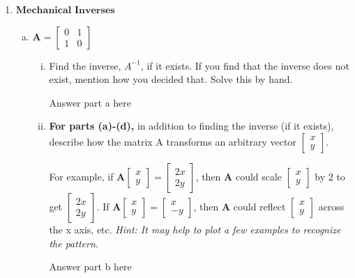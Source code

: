 \documentclass[11pt]{article}
\def\A{\textbf{A}} %
\begin{document}
\begin{enumerate}
	      \newpage
	\item $\textbf{Mechanical Inverses}$
	      \begin{enumerate}[(a)]
	      	\item $\A = \begin{bmatrix}
	      	      0 & 1 \\
	      	      1 & 0
	      	\end{bmatrix}$
	      	\begin{enumerate}[i.]
	      		\item Find the inverse, $A^{-1}$, if it exists. If you find that the inverse does not exist, mention how you decided that. Solve this by hand.
	      		      \begin{Answer}
	      		      	Answer part a here
	      		      \end{Answer}
	      		\item \textbf{For parts (a)-(d),} in addition to finding the inverse (if it exists), describe how the matrix A transforms an arbitrary vector $\begin{bmatrix}
	      		      x \\
	      		      y
	      		\end{bmatrix}$.
	      			      		                    
	      		For example, if $\A \begin{bmatrix}
	      		x \\
	      		y
	      		\end{bmatrix} = \begin{bmatrix}
	      		2x \\
	      		2y
	      		\end{bmatrix}$, then $\A$ could scale $\begin{bmatrix}
	      		x \\
	      		y
	      		\end{bmatrix}$ by 2 to get $\begin{bmatrix}
	      		2x \\
	      		2y
	      		\end{bmatrix}$. If $\A \begin{bmatrix}
	      		x \\
	      		y
	      		\end{bmatrix}
	      		=
	      		\begin{bmatrix}
	      			x  \\
	      			-y 
	      		\end{bmatrix}$, then $\A$ could reflect $\begin{bmatrix}
	      		x \\
	      		y
	      		\end{bmatrix}$ across the x axis, etc. \textit{Hint: It may help to plot a few examples to recognize the pattern.}
	      		\begin{Answer}
	      			Answer part b here
	      		\end{Answer}
	      	\end{enumerate}
	      		      	               

\end{enumerate}
\end{enumerate}
\end{document}
